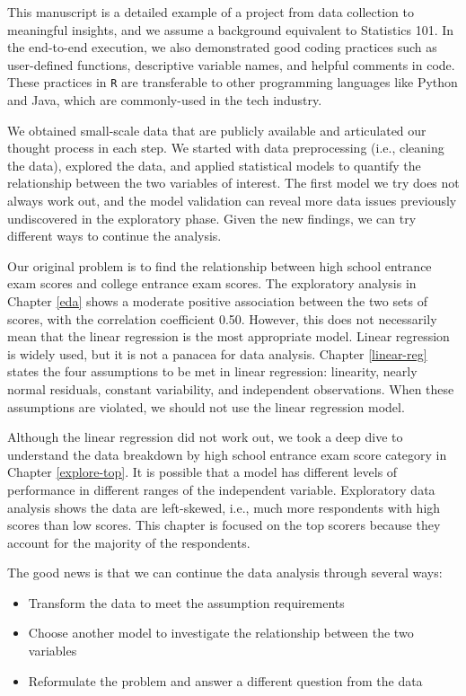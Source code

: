 \documentclass[
]{article}
\begin{document}
This manuscript is a detailed example of a project from data collection
to meaningful insights, and we assume a background equivalent to
Statistics 101. In the end-to-end execution, we also demonstrated good
coding practices such as user-defined functions, descriptive variable
names, and helpful comments in code. These practices in \texttt{R} are
transferable to other programming languages like Python and Java, which
are commonly-used in the tech industry.

We obtained small-scale data that are publicly available and articulated
our thought process in each step. We started with data preprocessing
(i.e., cleaning the data), explored the data, and applied statistical
models to quantify the relationship between the two variables of
interest. The first model we try does not always work out, and the model
validation can reveal more data issues previously undiscovered in the
exploratory phase. Given the new findings, we can try different ways to
continue the analysis.

Our original problem is to find the relationship between high school
entrance exam scores and college entrance exam scores. The exploratory
analysis in Chapter \ref{eda} shows a moderate positive association
between the two sets of scores, with the correlation coefficient 0.50.
However, this does not necessarily mean that the linear regression is
the most appropriate model. Linear regression is widely used, but it is
not a panacea for data analysis. Chapter \ref{linear-reg} states the
four assumptions to be met in linear regression: linearity, nearly
normal residuals, constant variability, and independent observations.
When these assumptions are violated, we should not use the linear
regression model.

Although the linear regression did not work out, we took a deep dive to
understand the data breakdown by high school entrance exam score
category in Chapter \ref{explore-top}. It is possible that a model has
different levels of performance in different ranges of the independent
variable. Exploratory data analysis shows the data are left-skewed,
i.e., much more respondents with high scores than low scores. This
chapter is focused on the top scorers because they account for the
majority of the respondents.

The good news is that we can continue the data analysis through several
ways:

\begin{itemize}
\item
  Transform the data to meet the assumption requirements
\item
  Choose another model to investigate the relationship between the two
  variables
\item
  Reformulate the problem and answer a different question from the data
\end{itemize}
\end{document}
